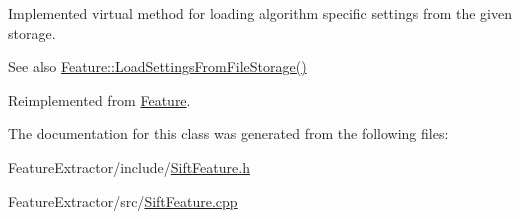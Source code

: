 Implemented virtual method for loading algorithm specific settings from the given storage. 

\begin{DoxySeeAlso}{See also}
\hyperlink{class_feature_a2ce73a191961cbd5f8fe8bc47f4e08c1}{Feature\-::\-Load\-Settings\-From\-File\-Storage()} 
\end{DoxySeeAlso}


Reimplemented from \hyperlink{class_feature_a2ce73a191961cbd5f8fe8bc47f4e08c1}{Feature}.


\begin{DoxyCode}
{
}
\end{DoxyCode}


The documentation for this class was generated from the following files\-:\begin{DoxyCompactItemize}
\item 
Feature\-Extractor/include/\hyperlink{_sift_feature_8h}{Sift\-Feature.\-h}\item 
Feature\-Extractor/src/\hyperlink{_sift_feature_8cpp}{Sift\-Feature.\-cpp}\end{DoxyCompactItemize}
